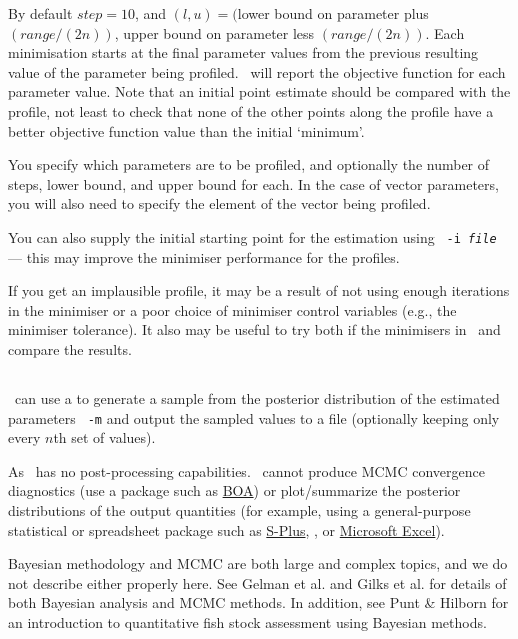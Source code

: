 By default $step=10$, and $(l, u)=($lower bound on parameter plus $(range/(2n))$, upper bound on parameter less $(range/(2n))$. Each minimisation starts at the final parameter values from the previous resulting value of the parameter being profiled. \CNAME\ will report the objective function for each parameter value. Note that an initial point estimate should be compared with the profile, not least to check that none of the other points along the profile have a better objective function value than the initial `minimum'.

You specify which parameters are to be profiled, and optionally the number of steps, lower bound, and upper bound for each. In the case of vector parameters, you will also need to specify the element of the vector being profiled. 

You can also supply the initial starting point for the estimation using \texttt{\cname\ -i \emph{file}} --- this may improve the minimiser performance for the profiles.

If you get an implausible profile, it may be a result of not using enough iterations in the minimiser or a poor choice of minimiser control variables (e.g., the minimiser tolerance). It also may be useful to try both if the minimisers in \CNAME\ and compare the results.

\subsection{\label{sec:estimate-MCMC}}

\CNAME\ can use a  to generate a sample from the posterior distribution of the estimated parameters \texttt{\cname\ -m} and output the sampled values to a file (optionally keeping only every $n$th set of values).

As \CNAME\ has no post-processing capabilities. \CNAME\ cannot produce MCMC convergence diagnostics (use a package such as \href{http://www.public-health.uiowa.edu/boa}{BOA}) or plot/summarize the posterior distributions of the output quantities (for example, using a general-purpose statistical or spreadsheet package such as \href{http://www.insightful.com}{S-Plus}, \href{http://www.r-project.org}{\R}, or \href{http://www.microsoft.com}{Microsoft Excel}).

Bayesian methodology and MCMC are both large and complex topics, and we do not describe either properly here. See Gelman et al. \citeyearpar{823} and Gilks et al. \citeyearpar{143} for details of both Bayesian analysis and MCMC methods. In addition, see Punt \& Hilborn \citeyearpar{828} for an introduction to quantitative fish stock assessment using Bayesian methods. 

